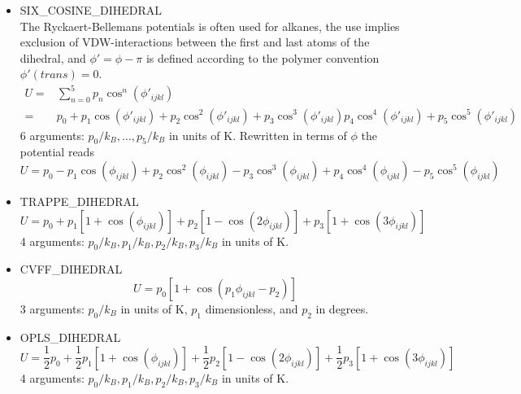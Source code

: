 \begin{itemize}
  \item{SIX\_COSINE\_DIHEDRAL}\\
  The Ryckaert-Bellemans potentials is often used for alkanes, the use implies exclusion of VDW-interactions
  between the first and last atoms of the dihedral, and $\phi'=\phi-\pi$ is defined according to the
  polymer convention $\phi'(trans)=0$.
  \begin{align}
  U=&\sum_{n=0}^5 p_n \cos^n\left(\phi'_{ijkl}\right)\\
    =&p_0+p_1\cos\left(\phi'_{ijkl}\right)+p_2\cos^2\left(\phi'_{ijkl}\right)+p_3\cos^3\left(\phi'_{ijkl}\right)
    p_4\cos^4\left(\phi'_{ijkl}\right)+p_5\cos^5\left(\phi'_{ijkl}\right)
  \end{align}
  6 arguments: $p_0/k_B,\dots,p_5/k_B$ in units of K.
  Rewritten in terms of $\phi$ the potential reads
  \begin{equation}
  U=p_0-p_1\cos\left(\phi_{ijkl}\right)+p_2\cos^2\left(\phi_{ijkl}\right)
    -p_3\cos^3\left(\phi_{ijkl}\right)+p_4\cos^4\left(\phi_{ijkl}\right)
    -p_5\cos^5\left(\phi_{ijkl}\right)
  \end{equation}

  \item{TRAPPE\_DIHEDRAL}\\
  \begin{equation}
  U=p_0+p_1\left[1+\cos\left(\phi_{ijkl}\right)\right]+
        p_2\left[1-\cos\left(2\phi_{ijkl}\right)\right]+
        p_3\left[1+\cos\left(3\phi_{ijkl}\right)\right]
  \end{equation}
  4 arguments: $p_0/k_B,p_1/k_B,p_2/k_B,p_3/k_B$ in units of K.

  \item{CVFF\_DIHEDRAL}\\
  \begin{equation}
  U=p_0\left[1+\cos\left(p_1\phi_{ijkl}-p_2\right)\right]
  \end{equation}
  3 arguments: $p_0/k_B$ in units of K, $p_1$ dimensionless, and $p_2$ in degrees.

  \item{OPLS\_DIHEDRAL}\\
  \begin{equation}
  U= \frac{1}{2}p_0+
    \frac{1}{2}p_1\left[1+\cos\left(\phi_{ijkl}\right)\right]+
    \frac{1}{2}p_2\left[1-\cos\left(2\phi_{ijkl}\right)\right]+
    \frac{1}{2}p_3\left[1+\cos\left(3\phi_{ijkl}\right)\right]
  \end{equation}
  4 arguments: $p_0/k_B,p_1/k_B,p_2/k_B,p_3/k_B$ in units of K.


\end{itemize}
